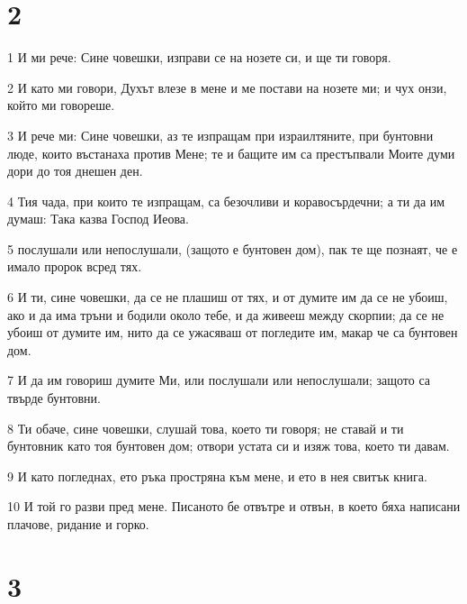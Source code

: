 \chapter{2}

\par 1 И ми рече: Сине човешки, изправи се на нозете си, и ще ти говоря.
\par 2 И като ми говори, Духът влезе в мене и ме постави на нозете ми; и чух онзи, който ми говореше.
\par 3 И рече ми: Сине човешки, аз те изпращам при израилтяните, при бунтовни люде, които въстанаха против Мене; те и бащите им са престъпвали Моите думи дори до тоя днешен ден.
\par 4 Тия чада, при които те изпращам, са безочливи и коравосърдечни; а ти да им думаш: Така казва Господ Иеова.
\par 5 послушали или непослушали, (защото е бунтовен дом), пак те ще познаят, че е имало пророк всред тях.
\par 6 И ти, сине човешки, да се не плашиш от тях, и от думите им да се не убоиш, ако и да има тръни и бодили около тебе, и да живееш между скорпии; да се не убоиш от думите им, нито да се ужасяваш от погледите им, макар че са бунтовен дом.
\par 7 И да им говориш думите Ми, или послушали или непослушали; защото са твърде бунтовни.
\par 8 Ти обаче, сине човешки, слушай това, което ти говоря; не ставай и ти бунтовник като тоя бунтовен дом; отвори устата си и изяж това, което ти давам.
\par 9 И като погледнах, ето ръка простряна към мене, и ето в нея свитък книга.
\par 10 И той го разви пред мене. Писаното бе отвътре и отвън, в което бяха написани плачове, ридание и горко.

\chapter{3}

